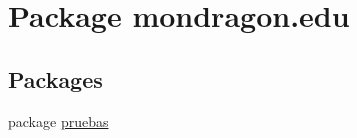 \hypertarget{namespacemondragon_1_1edu}{}\section{Package mondragon.\+edu}
\label{namespacemondragon_1_1edu}
\subsection*{Packages}
\begin{DoxyCompactItemize}
\item 
package \mbox{\hyperlink{namespacemondragon_1_1edu_1_1pruebas}{pruebas}}
\end{DoxyCompactItemize}
